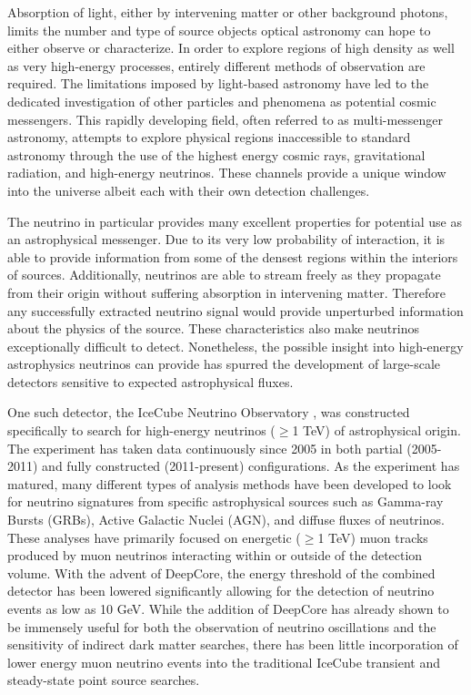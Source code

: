 \documentclass{gatech-thesis}
\begin{document}
Absorption of light, either by intervening matter or other background photons, limits the number and type of source objects optical astronomy can hope to either observe or characterize. In order to explore regions of high density as well as very high-energy processes, entirely different methods of observation are required. The limitations imposed by light-based astronomy have led to the dedicated investigation of other particles and phenomena as potential cosmic messengers. This rapidly developing field, often referred to as multi-messenger astronomy, attempts to explore physical regions inaccessible to standard astronomy through the use of the highest energy cosmic rays, gravitational radiation, and high-energy neutrinos. These channels provide a unique window into the universe albeit each with their own detection challenges.

The neutrino in particular provides many excellent properties for potential use as an astrophysical messenger. Due to its very low probability of interaction, it is able to provide information from some of the densest regions within the interiors of sources. Additionally, neutrinos are able to stream freely as they propagate from their origin without suffering absorption in intervening matter. Therefore any successfully extracted neutrino signal would provide unperturbed information about the physics of the source. These characteristics also make neutrinos exceptionally difficult to detect. Nonetheless, the possible insight into high-energy astrophysics neutrinos can provide has spurred the development of large-scale detectors sensitive to expected astrophysical fluxes.

One such detector, the IceCube Neutrino Observatory \cite{2006APh....26..155I}, was constructed specifically to search for high-energy neutrinos ($\geq$1 TeV) of astrophysical origin. The experiment has taken data continuously since 2005 in both partial (2005-2011) and fully constructed (2011-present) configurations. As the experiment has matured, many different types of analysis methods have been developed to look for neutrino signatures from specific astrophysical sources such as Gamma-ray Bursts (GRBs), Active Galactic Nuclei (AGN), and diffuse fluxes of neutrinos. These analyses have primarily focused on energetic ($\geq$1 TeV) muon tracks produced by muon neutrinos interacting within or outside of the detection volume. With the advent of DeepCore\cite{2012APh....35..615A}, the energy threshold of the combined detector has been lowered significantly allowing for the detection of neutrino events as low as 10 GeV. While the addition of DeepCore has already shown to be immensely useful for both the observation of neutrino oscillations and the sensitivity of indirect dark matter searches, there has been little incorporation of lower energy muon neutrino events into the traditional IceCube transient and steady-state point source searches.
\end{document}
